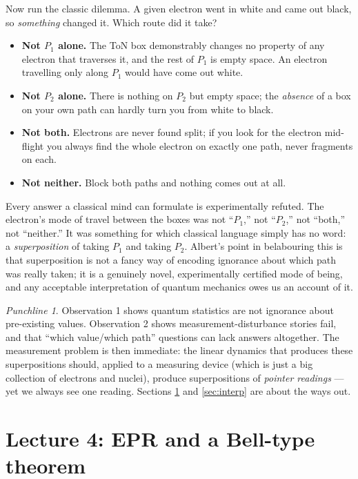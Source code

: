 \documentclass[11pt,a4paper]{article}
\theoremstyle{remark}
\newtheorem*{punchline}{Punchline}
\begin{document}
Now run the classic dilemma. A given electron went in white and came out black,
so \emph{something} changed it. Which route did it take?
\begin{itemize}
  \item \textbf{Not $P_1$ alone.} The ToN box demonstrably changes no property of
        any electron that traverses it, and the rest of $P_1$ is empty space.
        An electron travelling only along $P_1$ would have come out white.
  \item \textbf{Not $P_2$ alone.} There is nothing on $P_2$ but empty space; the
        \emph{absence} of a box on your own path can hardly turn you from white to
        black.
  \item \textbf{Not both.} Electrons are never found split; if you look for the
        electron mid-flight you always find the whole electron on exactly one path,
        never fragments on each.
  \item \textbf{Not neither.} Block both paths and nothing comes out at all.
\end{itemize}
Every answer a classical mind can formulate is experimentally refuted. The
electron's mode of travel between the boxes was not ``$P_1$,'' not ``$P_2$,'' not
``both,'' not ``neither.'' It was something for which classical language simply has
no word: a \emph{superposition} of taking $P_1$ and taking $P_2$. Albert's point in
belabouring this is that superposition is not a fancy way of encoding ignorance
about which path was really taken; it is a genuinely novel, experimentally
certified mode of being, and any acceptable interpretation of quantum mechanics
owes us an account of it.

\begin{punchline}
Observation 1 shows quantum statistics are not ignorance about pre-existing
values. Observation 2 shows measurement-disturbance stories fail, and that
``which value/which path'' questions can lack answers altogether. The measurement
problem is then immediate: the linear dynamics that produces these superpositions
should, applied to a measuring device (which is just a big collection of
electrons and nuclei), produce superpositions of \emph{pointer readings} --- yet we
always see one reading. Sections \ref{sec:epr} and \ref{sec:interp} are about the
ways out.
\end{punchline}

\section{Lecture 4: EPR and a Bell-type theorem}\label{sec:epr}
\end{document}
